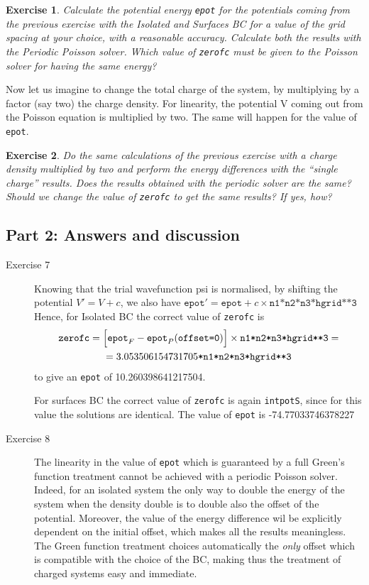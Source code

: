 \documentclass[a4paper]{article}
\newtheorem{exercise}{Exercise}
\begin{document}
\begin{exercise}
Calculate the potential energy \texttt{epot} for the potentials coming from the previous exercise with the Isolated and Surfaces BC for a value of the grid spacing at your choice, with a reasonable accuracy.
Calculate both the results with the Periodic Poisson solver. Which value of \texttt{zerofc} must be given to the Poisson solver for having the same energy?
\end{exercise}
Now let us imagine to change the total charge of the system, by multiplying by a factor (say two) the charge density. For linearity, the potential V coming out from the Poisson equation is multiplied by two. The same will happen for the value of \texttt{epot}.
\begin{exercise}
Do the same calculations of the previous exercise with a charge density multiplied by two and perform the energy differences with the ``single charge'' results. Does the results obtained with the periodic solver are the same? Should we change the value of \texttt{zerofc}  to get the same results? If yes, how?
\end{exercise}
\subsection*{Part 2: Answers and discussion}
\begin{description}
 \item[Exercise 7] Knowing that the trial wavefunction psi is normalised, by shifting the potential $V'=V+c$, we also have $\texttt{epot}'=\texttt{epot}+ c \times \texttt{n1*n2*n3*hgrid**3}$
Hence, for Isolated BC the correct value of \texttt{zerofc} is
\begin{multline}
 \texttt{zerofc}=\Bigl[\texttt{epot}_F - \texttt{epot}_P(\texttt{offset=0})\Bigr]\times\texttt{n1*n2*n3*hgrid**3} =\\= 3.053506154731705  \texttt{*n1*n2*n3*hgrid**3}
\end{multline}
to give an \texttt{epot} of 10.260398641217504.

For surfaces BC the correct value of \texttt{zerofc} is again \texttt{intpotS}, since for this value the solutions are identical. The value of \texttt{epot} is -74.77033746378227

\item[Exercise 8] 
The linearity in the value of \texttt{epot} which is guaranteed by a full Green's function treatment cannot be achieved with a periodic Poisson solver. Indeed, for an isolated system the only way to double the energy of the system when the density double is to double also the offset of the potential. Moreover, the value of the energy difference wil be explicitly dependent on the initial offset, which makes all the results meaningless. The Green function treatment choices automatically the \emph{only} offset which is compatible with the choice of the BC, making thus the treatment of charged systems easy and immediate.

\end{description}
\clearpage
\end{document}
